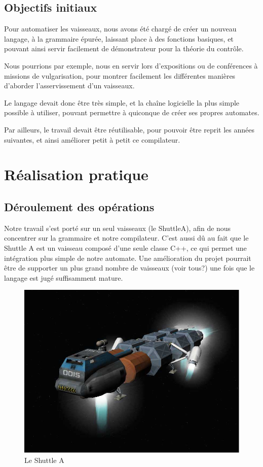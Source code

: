 \documentclass[a4paper,11pt]{article}
\begin{document}
    \subsection{Objectifs initiaux}
        Pour automatiser les vaisseaux, nous avons été chargé de créer un nouveau langage, à la grammaire épurée, laissant place à des fonctions basiques, et pouvant ainsi servir facilement de démonstrateur pour la théorie du contrôle.

        Nous pourrions par exemple, nous en servir lors d'expositions ou de conférences à missions de vulgarisation, pour montrer facilement les différentes manières d'aborder l'asservissement d'un vaisseaux.

        Le langage devait donc être très simple, et la chaîne logicielle la plus simple possible à utiliser, pouvant permettre à quiconque de créer ses propres automates.

        Par ailleurs, le travail devait être réutilisable, pour pouvoir être reprit les années suivantes, et ainsi améliorer petit à petit ce compilateur.

\section{Réalisation pratique}
    \subsection{Déroulement des opérations}
        Notre travail s'est porté sur un seul vaisseaux (le ShuttleA), afin de nous concentrer sur la grammaire et notre compilateur. C'est aussi dû au fait que le Shuttle A est un vaisseau composé d'une seule classe C++, ce qui permet une intégration plus simple de notre automate. Une amélioration du projet pourrait être de supporter un plus grand nombre de vaisseaux (voir tous?) une fois que le langage est jugé suffisamment mature.
				
				\begin{figure}[!h]
            \begin{center}
                \includegraphics[width=1\textwidth]{img/shuttleA.png}
                \caption{Le Shuttle A}
            \end{center}
        \end{figure}
				
\end{document}
